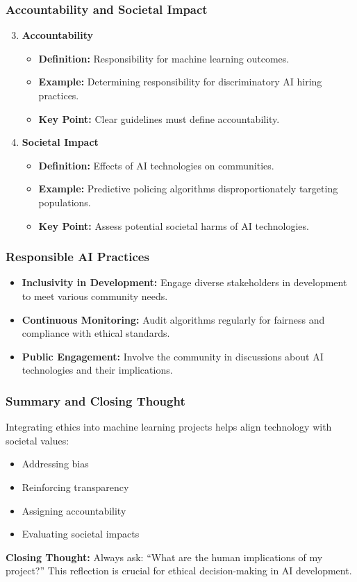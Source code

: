 \documentclass[aspectratio=169]{beamer}
\begin{document}
\begin{frame}[fragile]
    \frametitle{Accountability and Societal Impact}
    \begin{enumerate}
        \setcounter{enumi}{2}
        \item \textbf{Accountability}
        \begin{itemize}
            \item \textbf{Definition:} Responsibility for machine learning outcomes.
            \item \textbf{Example:} Determining responsibility for discriminatory AI hiring practices.
            \item \textbf{Key Point:} Clear guidelines must define accountability.
        \end{itemize}
        
        \item \textbf{Societal Impact}
        \begin{itemize}
            \item \textbf{Definition:} Effects of AI technologies on communities.
            \item \textbf{Example:} Predictive policing algorithms disproportionately targeting populations.
            \item \textbf{Key Point:} Assess potential societal harms of AI technologies.
        \end{itemize}
    \end{enumerate}
\end{frame}

\begin{frame}[fragile]
    \frametitle{Responsible AI Practices}
    \begin{itemize}
        \item \textbf{Inclusivity in Development:} Engage diverse stakeholders in development to meet various community needs.
        \item \textbf{Continuous Monitoring:} Audit algorithms regularly for fairness and compliance with ethical standards.
        \item \textbf{Public Engagement:} Involve the community in discussions about AI technologies and their implications.
    \end{itemize}
\end{frame}

\begin{frame}[fragile]
    \frametitle{Summary and Closing Thought}
    Integrating ethics into machine learning projects helps align technology with societal values:
    \begin{itemize}
        \item Addressing bias
        \item Reinforcing transparency
        \item Assigning accountability
        \item Evaluating societal impacts
    \end{itemize}
    
    \textbf{Closing Thought:} Always ask: ``What are the human implications of my project?'' This reflection is crucial for ethical decision-making in AI development.
\end{frame}
\end{document}
